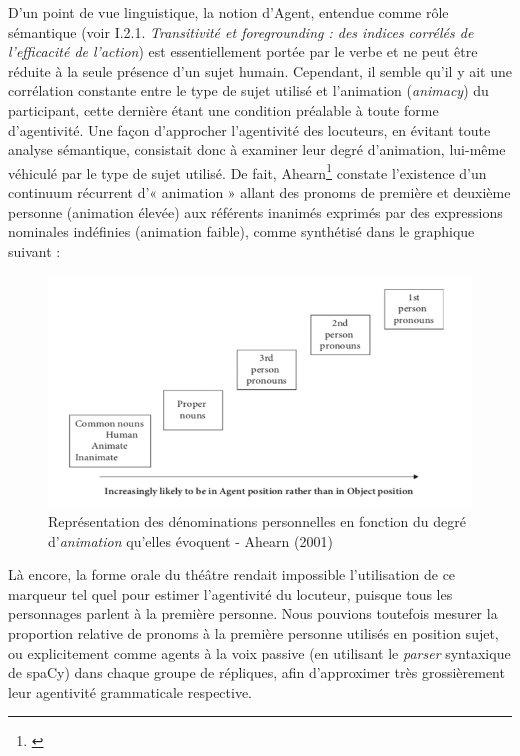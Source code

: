 D'un point de vue linguistique, la notion d'Agent, entendue comme rôle sémantique (voir I.2.1.\textit{ Transitivité et foregrounding : des indices corrélés de l'efficacité de l'action}) est essentiellement portée par le verbe et ne peut être réduite à la seule présence d'un sujet humain. Cependant, il semble qu’il y ait une corrélation constante entre le type de sujet utilisé et l’animation (\textit{animacy}) du participant, cette dernière étant une condition préalable à toute forme d'agentivité. Une façon d'approcher l'agentivité des locuteurs, en évitant toute analyse sémantique, consistait donc à examiner leur degré d’animation, lui-même véhiculé par le type de sujet utilisé. De fait, Ahearn\footnote{\cite{ahearn_language_2001}} constate l’existence d’un continuum récurrent d'« animation » allant des pronoms de première et deuxième personne (animation élevée) aux référents inanimés exprimés par des expressions nominales indéfinies (animation faible), comme synthétisé dans le graphique suivant : 

\begin{figure}[!ht]
    \centering
    \includegraphics[width=16cm]{img/pronoun_animacy.png}
    \caption{Représentation des dénominations personnelles en fonction du degré d'\textit{animation} qu'elles évoquent - Ahearn (2001)}
    \label{pronoun_animacy}
\end{figure}

Là encore, la forme orale du théâtre rendait impossible l'utilisation de ce marqueur tel quel pour estimer l'agentivité du locuteur, puisque tous les personnages parlent à la première personne. Nous pouvions toutefois mesurer la proportion relative de pronoms à la première personne utilisés en position sujet, ou explicitement comme agents à la voix passive (en utilisant le \textit{parser} syntaxique de spaCy) dans chaque groupe de répliques, afin d’approximer très grossièrement leur agentivité grammaticale respective.

